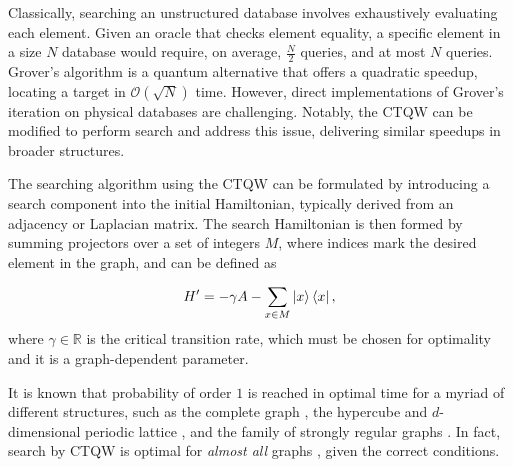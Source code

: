 \documentclass[../../main.tex]{subfiles}
\begin{document}
Classically, searching an unstructured database involves exhaustively
evaluating each element. Given an oracle that checks element equality, a
specific element in a size \( N \) database would require, on average,
$\frac{N}{2}$ queries, and at most $N$ queries. Grover's algorithm
\cite{grover1996} is a quantum alternative that offers a quadratic speedup,
locating a target in $\mathcal{O}(\sqrt{N})$ time. However, direct
implementations of Grover's iteration on physical databases are challenging.
Notably, the CTQW can be modified to perform search \cite{farhi1996} and
address this issue, delivering similar speedups in broader structures.

The searching algorithm using the CTQW can be formulated by introducing a
search component into the initial Hamiltonian, typically derived from an
adjacency or Laplacian matrix. The search Hamiltonian is then formed by summing
projectors over a set of integers $M$, where indices mark the desired
element in the graph, and can be defined as

\begin{equation}
    H^\prime = -\gamma A - \sum_{x \in M} \ket{x}\bra{x},
    \label{eq:searchHamiltonian}
\end{equation}
where $\gamma \in \mathbb{R}$ is the critical transition rate, which must be
chosen for optimality and it is a graph-dependent parameter.

It is known that probability of order $1$ is reached in optimal time for a
myriad of different structures, such as the complete graph \cite{farhi1996},
the hypercube and $d$-dimensional periodic lattice \cite{childs2004}, and the
family of strongly regular graphs \cite{Janmark2014}. In fact, search by CTQW
is optimal for \textit{almost all} graphs \cite{chakraborty2016}, given the
correct conditions.\par
\end{document}
